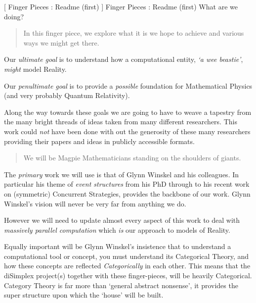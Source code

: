 
[
  Finger Pieces : Readme (first)
]{
  Finger Pieces : Readme (first) What are we doing?
}
\author{Stephen Gaito}

\maketitle

\begin{abstract}
  In this finger piece, we explore what it is we hope to achieve and various
  ways we might get there.
\end{abstract}


Our \emph{ultimate goal} is to understand how a computational entity, \emph{`a
wee beastie'}, \emph{might} model Reality.

Our \emph{penultimate goal} is to provide a \emph{possible} foundation for
Mathematical Physics (and very probably Quantum Relativity).

Along the way towards these goals we are going to have to weave a tapestry from
the many bright threads of ideas taken from many different researchers. This
work could \emph{not} have been done with out the generosity of these many
researchers providing their papers and ideas in publicly accessible formats.

\begin{quote}
  We will be Magpie Mathematicians standing on the shoulders of
  giants.
\end{quote}

The \emph{primary} work we will use is that of Glynn Winskel and his colleagues.
In particular his theme of \emph{event structures} from his PhD through to his
recent work on (symmetric) Concurrent Strategies, provides the backbone of our
work. Glynn Winskel's vision will never be very far from anything we do.

However we will need to update almost every aspect of this work to deal with
\emph{massively parallel computation} which \emph{is} our approach to models of
Reality.

Equally important will be Glynn Winskel's insistence that to understand a
computational tool or concept, you must understand its Categorical Theory, and
how these concepts are reflected \emph{Categorically} in each other. This means
that the diSimplex project(s) together with these finger-pieces, will be heavily
Categorical. Category Theory is far more than `general abstract nonsense', it
provides the super structure upon which the `house' will be built.

